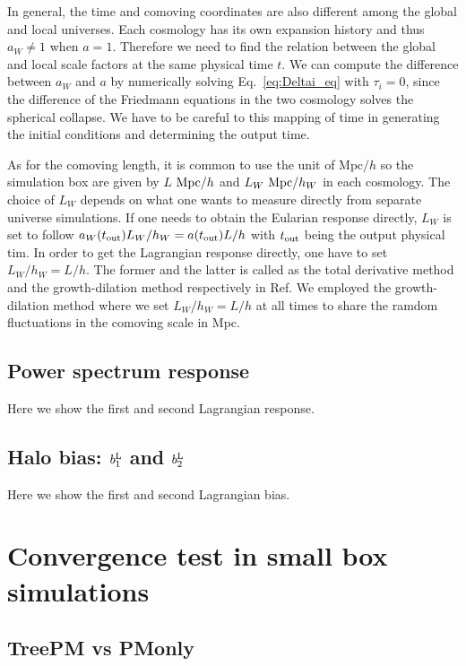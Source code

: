 \documentclass[a4paper,11pt]{article}
\begin{document}
In general, the time and comoving coordinates are also different among the global and local universes.
Each cosmology has its own expansion history and thus $a_W\neq 1$ when $a=1$. 
Therefore we need to find the relation between the global and local scale factors at the same physical time $t$.
We can compute the difference between $a_W$ and $a$ by numerically solving Eq.~\eqref{eq:Deltai_eq} with $\tau_i=0$,
since the difference of the Friedmann equations in the two cosmology solves the spherical collapse.
We have to be careful to this mapping of time in generating the initial conditions and determining the output time. 

As for the comoving length, it is common to use the unit of $\mathrm{Mpc}/h$ so the simulation box are given by
$L~{\rm Mpc}/h$ and $L_W~{\rm Mpc}/h_W$ in each cosmology.
The choice of $L_W$ depends on what one wants to measure directly from separate universe simulations.
If one needs to obtain the Eularian response directly, $L_W$ is set to follow $a_W(t_{\rm out})L_W/h_W = a(t_{\rm out})L/h$ 
with $t_{\rm out}$ being the output physical tim.
In order to get the Lagrangian response directly, one have to set $L_W/h_W = L/h$.
The former and the latter is called as the total derivative method and the growth-dilation method respectively in Ref.
We employed the growth-dilation method where we set $L_W/h_W = L/h$ at all times to share the ramdom fluctuations 
in the comoving scale in Mpc.

\subsection{Power spectrum response}  
Here we show the first and second Lagrangian response.

\subsection{Halo bias: $b_1^{\rm L}$ and $b_2^{\rm L}$} 
Here we show the first and second Lagrangian bias.

\section{Convergence test in small box simulations}
\label{app:250}

\subsection{TreePM vs PMonly}
\label{app:250}
\end{document}
